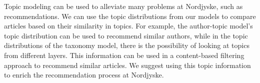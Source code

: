 Topic modeling can be used to alleviate many problems at Nordjyske, such as recommendations.
We can use the topic distributions from our models to compare articles based on their similarity in topics.
For example, the author-topic model's topic distribution can be used to recommend similar authors, while in the topic distributions of the taxonomy model, there is the possibility of looking at topics from different layers.
This information can be used in a content-based filtering approach to recommend similar articles.
We suggest using this topic information to enrich the recommendation process at Nordjyske. 
